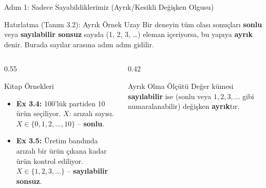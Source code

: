 ﻿\documentclass[light]{lutbeamer}
\begin{document}
\begin{frame}{Adım 1: Sadece Sayabildiklerimiz (Ayrık/Kesikli Değişken Olgusu)}
\begin{block}{Hatırlatma (Tanım 3.2): Ayrık Örnek Uzay}
  Bir deneyin tüm olası sonuçları \textbf{sonlu} veya \textbf{sayılabilir sonsuz} sayıda (1, 2, 3, \dots) eleman içeriyorsa, bu yapıya \textbf{ayrık} denir. Burada sayılar arasına adım adım gidilir.
\end{block}

\begin{columns}[T]
  \begin{column}{0.55\textwidth}
    \begin{exampleblock}{Kitap Örnekleri}
      \begin{itemize}
        \item \textbf{Ex 3.4:} 100'lük partiden 10 ürün seçiliyor. $X$: arızalı sayısı.
        $X \in \{0, 1, 2, \dots, 10\}$ -- \textbf{sonlu}.
        \item \textbf{Ex 3.5:} Üretim bandında arızalı bir ürün çıkana kadar ürün kontrol ediliyor.\\
        $X \in \{1, 2, 3, \dots\}$ -- \textbf{sayılabilir sonsuz}.
      \end{itemize}
    \end{exampleblock}
  \end{column}
  \begin{column}{0.42\textwidth}
    \begin{alertblock}{Ayrık Olma Ölçütü}
      Değer kümesi \textbf{sayılabilir} ise (sonlu veya $1, 2, 3, \dots$ gibi numaralanabilir) değişken \textbf{ayrık}tır.
    \end{alertblock}
  \end{column}
\end{columns}
\end{frame}
\end{document}
